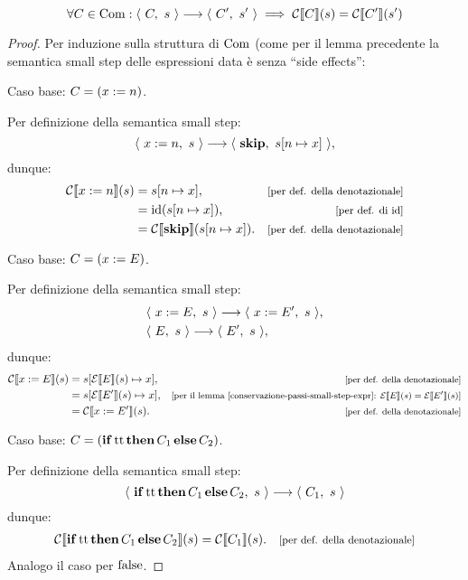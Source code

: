 \begin{proposizione}
\[
  \forall C \in \mathrm{Com} \mathrel{:} \langle\ C,\ s\ \rangle \longrightarrow \langle\ C',\ s'\ \rangle
  \implies \mathcal{C}\llbracket C \rrbracket(s) = \mathcal{C}\llbracket C' \rrbracket(s')
\]
\begin{proof}
Per induzione sulla struttura di $\mathrm{Com}$ (come per il lemma precedente
la semantica small step delle espressioni data è senza ``side effects'':

Caso base: $C = (x := n)$.

Per definizione della semantica small step:
\[
  \langle\ x := n,\ s\ \rangle \longrightarrow \langle\ \mathop{\textup{\textbf{skip}}},\ s[n\mapsto x]\ \rangle,
\]
dunque:
\begin{align*}
  \calC\llbracket x \weq n \rrbracket(s)
  &= \assign{s}{n}{x},
    &\law{per def. della denotazionale} \\
  &= \id(\assign{s}{n}{x}),
    &\law{per def. di $\id$} \\
  &= \calC\llbracket \kw{skip} \rrbracket(\assign{s}{n}{x}).
     &\law{per def. della denotazionale} \\
\end{align*}

Caso base: $C = (x := E)$.

Per definizione della semantica small step:
\begin{align*}
  &\langle\ x := E,\ s\ \rangle \longrightarrow \langle\ x := E',\ s\ \rangle, \\
  &\langle\ E,\ s\ \rangle \longrightarrow \langle\ E',\ s\ \rangle,
\end{align*}
dunque:
\begin{align*}
  \calC\llbracket x \weq E \rrbracket(s)
  &= \assign{s}{\calE\llbracket E \rrbracket(s)}{x},
    &\law{per def. della denotazionale} \\
  &= \assign{s}{\calE\llbracket E' \rrbracket(s)}{x},
    &\law{per il lemma
      \ref{conservazione-passi-small-step-expr}:
      $\calE\llbracket E \rrbracket(s)
      = \calE\llbracket E' \rrbracket(s)$} \\
  &= \calC\llbracket x \weq E' \rrbracket(s).
    &\law{per def. della denotazionale}
\end{align*}

Caso base: $C = (\mathop{\textup{\textbf{if}}} \mathrm{tt} \mathop{\textup{\textbf{then}}} C_1 \mathop{\textup{\textbf{else}}} C_2)$.

Per definizione della semantica small step:
\[
  \langle\ \mathop{\textup{\textbf{if}}} \mathrm{tt} \mathop{\textup{\textbf{then}}} C_1 \mathop{\textup{\textbf{else}}} C_2,\ s\ \rangle \longrightarrow \langle\ C_1,\ s\ \rangle
\]
dunque:
\begin{align*}
  \calC\llbracket \kw{if} \ttv \kw{then} C_1 \kw{else} C_2 \rrbracket(s)
  &= \calC\llbracket C_1 \rrbracket(s).
    &\law{per def. della denotazionale} \\
\end{align*}
Analogo il caso per $\mathrm{false}$.


\end{proof}
\end{proposizione}
